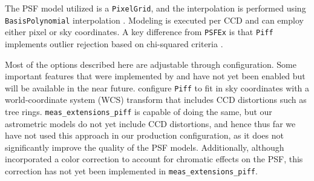 The PSF model utilized is a \texttt{PixelGrid}, and the interpolation is performed using \texttt{BasisPolynomial} interpolation \citep{2021MNRAS.501.1282J}.
Modeling is executed per CCD and can employ either pixel or sky coordinates.
A key difference from \texttt{PSFEx} is that  \texttt{Piff} implements outlier rejection based on chi-squared criteria \citep[see][for more details]{2021MNRAS.501.1282J}.

Most of the options described here are adjustable through configuration.
Some important features that were implemented by \citet{2021MNRAS.501.1282J} and \citet{2025OJAp....8E..26S} have not yet been enabled but will be available in the near future.
\citet{2021MNRAS.501.1282J} configure \texttt{Piff} to fit in sky coordinates with a world-coordinate system (WCS) transform that includes CCD distortions such as tree rings.
\texttt{meas\_extensions\_piff} is capable of doing the same, but our astrometric models do not yet include CCD distortions, and hence thus far we have not used this approach in our production configuration, as it does not significantly improve the quality of the PSF models.
Additionally, although \citet{2025OJAp....8E..26S} incorporated a color correction to account for chromatic effects on the PSF, this correction has not yet been implemented in  \texttt{meas\_extensions\_piff}.
